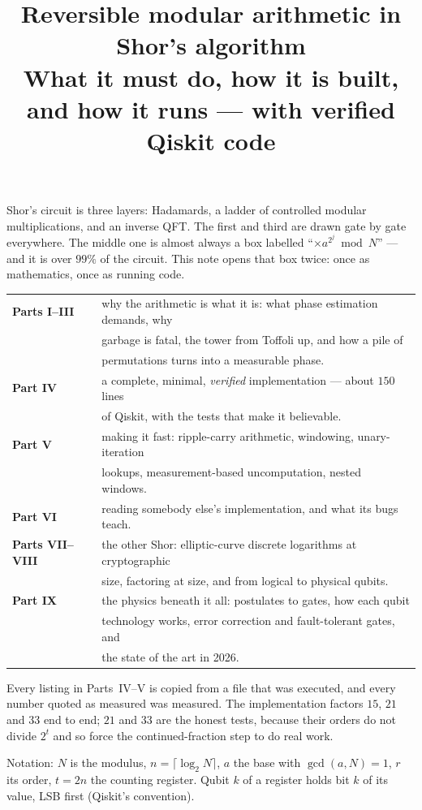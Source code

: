 \documentclass[11pt]{article}
\title{\bfseries Reversible modular arithmetic in Shor's algorithm\\[4pt]
\large What it must do, how it is built, and how it runs --- with verified Qiskit code}
\author{}
\date{}
\theoremstyle{plain}
\theoremstyle{remark}
\begin{document}
\maketitle
\vspace{-2.2em}

\begin{keybox}[title={What this is, and how to read it}]
Shor's circuit is three layers: Hadamards, a ladder of controlled modular multiplications, and an
inverse QFT. The first and third are drawn gate by gate everywhere. The middle one is almost always
a box labelled ``$\times a^{2^j}\bmod N$'' --- and it is over $99\%$ of the circuit. This note
opens that box twice: once as mathematics, once as running code.

\medskip
\begin{tabular}{@{}ll@{}}
\textbf{Parts I--III} & why the arithmetic is what it is: what phase estimation demands, why\\
                      & garbage is fatal, the tower from Toffoli up, and how a pile of\\
                      & permutations turns into a measurable phase.\\[4pt]
\textbf{Part IV}      & a complete, minimal, \emph{verified} implementation --- about $150$ lines\\
                      & of Qiskit, with the tests that make it believable.\\[4pt]
\textbf{Part V}       & making it fast: ripple-carry arithmetic, windowing, unary-iteration\\
                      & lookups, measurement-based uncomputation, nested windows.\\[4pt]
\textbf{Part VI}      & reading somebody else's implementation, and what its bugs teach.\\[4pt]
\textbf{Parts VII--VIII} & the other Shor: elliptic-curve discrete logarithms at cryptographic\\
                      & size, factoring at size, and from logical to physical qubits.\\[4pt]
\textbf{Part IX}      & the physics beneath it all: postulates to gates, how each qubit\\
                      & technology works, error correction and fault-tolerant gates, and\\
                      & the state of the art in 2026.\\
\end{tabular}

\medskip
Every listing in Parts~IV--V is copied from a file that was executed, and every number quoted as
measured was measured. The implementation factors $15$, $21$ and $33$ end to end; $21$ and $33$
are the honest tests, because their orders do not divide $2^t$ and so force the
continued-fraction step to do real work.

\medskip
Notation: $N$ is the modulus, $n=\lceil\log_2N\rceil$, $a$ the base with $\gcd(a,N)=1$, $r$ its
order, $t=2n$ the counting register. Qubit $k$ of a register holds bit $k$ of its value, LSB first
(Qiskit's convention).
\end{keybox}
\end{document}
